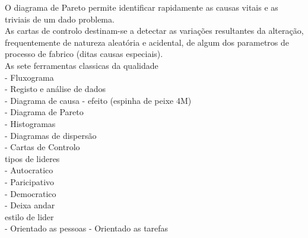 O diagrama de Pareto permite identificar rapidamente as causas vitais e as triviais de um dado problema.\\

As cartas de controlo destinam-se a detectar as variações resultantes da alteração, frequentemente de natureza aleatória e acidental, de algum dos parametros de processo de fabrico (ditas causas especiais).\\

As sete ferramentas classicas da qualidade\\
- Fluxograma\\
- Registo e análise de dados\\
- Diagrama de causa - efeito (espinha de peixe 4M)\\
- Diagrama de Pareto\\
- Histogramas\\
- Diagramas de dispersão\\
- Cartas de Controlo\\

tipos de lideres\\
- Autocratico\\
- Paricipativo \\
- Democratico \\
- Deixa andar\\

estilo de lider\\
- Orientado as pessoas
- Orientado as tarefas\\





\newpage
